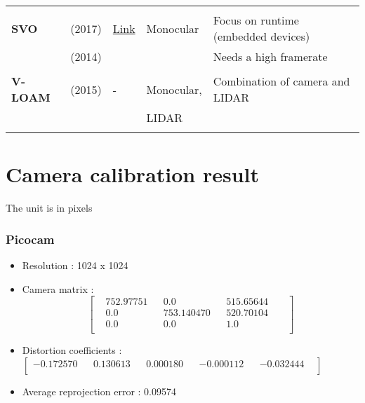 {\begin{longtable}{l|l|l|l|l}
			&                                   &                                                                    &                       &\\
			\textbf{SVO}           & \cite{7782863} (2017)         & {\href{https://github.com/uzh-rpg/rpg_svo}{Link}}                  & Monocular             & Focus on runtime (embedded devices)\\
			& \cite{Forster2014ICRA} (2014)        &                                                                    &                       & Needs a high framerate\\
			&                                   &                                                                    &                       &\\
			\textbf{V-LOAM}        & \cite{Zhang2015} (2015)           & -                                                                  & Monocular,            & Combination of camera and LIDAR\\
			&                                   &                                                                    & LIDAR                 &\\
			&                                   &                                                                    &                       &\\
		\end{longtable}				
		\newpage
	

\section{Camera calibration result}
\label{section:A.2}
The unit is in pixels
\subsubsection{Picocam}

\begin{itemize}
	\item Resolution : 1024 x 1024
	\item Camera matrix : 
	      \begin{equation*}     
			\begin{bmatrix}
				& 752.97751 & & 0.0 & &  515.65644 & &  \\
				& 0.0 & & 753.140470 & &520.70104  & &\\
				& 0.0 & & 0.0 & &   1.0  & &\\
			\end{bmatrix}
			 \end{equation*}
	\item Distortion coefficients : 
	$ \begin{bmatrix}  
	 	  -0.172570    & & 0.130613  & & 0.000180   &  &-0.000112  & & -0.032444 & \\
	 \end{bmatrix} $ 
	\item Average reprojection error : 0.09574
\end{itemize}

}
